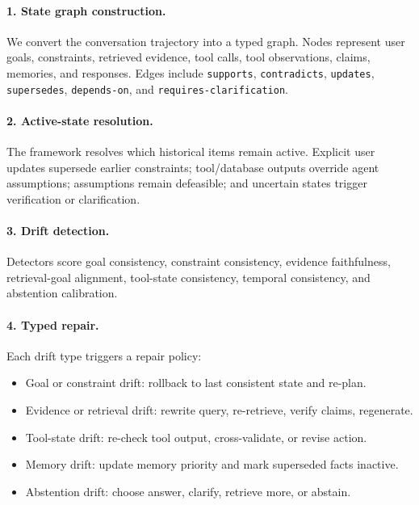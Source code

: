 \documentclass[letterpaper]{article}
\begin{document}
\paragraph{1. State graph construction.}
We convert the conversation trajectory into a typed graph. Nodes represent user goals, constraints, retrieved evidence, tool calls, tool observations, claims, memories, and responses. Edges include \texttt{supports}, \texttt{contradicts}, \texttt{updates}, \texttt{supersedes}, \texttt{depends-on}, and \texttt{requires-clarification}.

\paragraph{2. Active-state resolution.}
The framework resolves which historical items remain active. Explicit user updates supersede earlier constraints; tool/database outputs override agent assumptions; assumptions remain defeasible; and uncertain states trigger verification or clarification.

\paragraph{3. Drift detection.}
Detectors score goal consistency, constraint consistency, evidence faithfulness, retrieval-goal alignment, tool-state consistency, temporal consistency, and abstention calibration.

\paragraph{4. Typed repair.}
Each drift type triggers a repair policy:
\begin{itemize}
    \item Goal or constraint drift: rollback to last consistent state and re-plan.
    \item Evidence or retrieval drift: rewrite query, re-retrieve, verify claims, regenerate.
    \item Tool-state drift: re-check tool output, cross-validate, or revise action.
    \item Memory drift: update memory priority and mark superseded facts inactive.
    \item Abstention drift: choose answer, clarify, retrieve more, or abstain.
\end{itemize}
\end{document}
